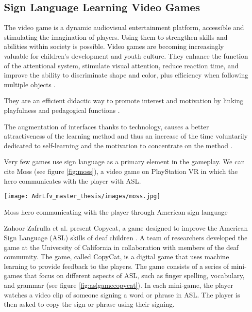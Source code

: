 
\subsection{Sign Language Learning Video Games}

The video game is a dynamic audiovisual entertainment platform, accessible and stimulating the imagination of players. Using them to strengthen skills and abilities within society is possible. Video games are becoming increasingly valuable for children's development and youth culture.
They enhance the function of the attentional system, stimulate visual attention, reduce reaction time, and improve the ability to discriminate shape and color, plus efficiency when following multiple objects \cite{green2006enumeration}.

They are an efficient didactic way to promote interest and motivation by linking playfulness and pedagogical functions \cite{tejeiro2009efectos}.

The augmentation of interfaces thanks to technology, causes a better attractiveness of the learning method and thus an increase of the time voluntarily dedicated to self-learning and the motivation to concentrate on the method \cite{baker1994}.

Very few games use sign language as a primary element in the gameplay. We can cite Moss \cite{moss2018} (see figure \ref{fig:moss}), a video game on PlayStation VR in which the hero communicates with the player with ASL. 

\begin{marginfigure}
    \centering
    \texttt{[image: AdrLfv\_master\_thesis/images/moss.jpg]}
    \caption{Moss hero communicating with the player through American sign language}
    \label{fig:moss}
\end{marginfigure}

Zahoor Zafrulla et al. present Copycat, a game designed to improve the American Sign Language (ASL) skills of deaf children \cite{zafrulla2011copycat}. A team of researchers developed the game at the University of California in collaboration with members of the deaf community.
The game, called CopyCat, is a digital game that uses machine learning to provide feedback to the players. The game consists of a series of mini-games that focus on different aspects of ASL, such as finger spelling, vocabulary, and grammar (see figure \ref{fig:aslgamecopycat}). In each mini-game, the player watches a video clip of someone signing a word or phrase in ASL. The player is then asked to copy the sign or phrase using their signing.

